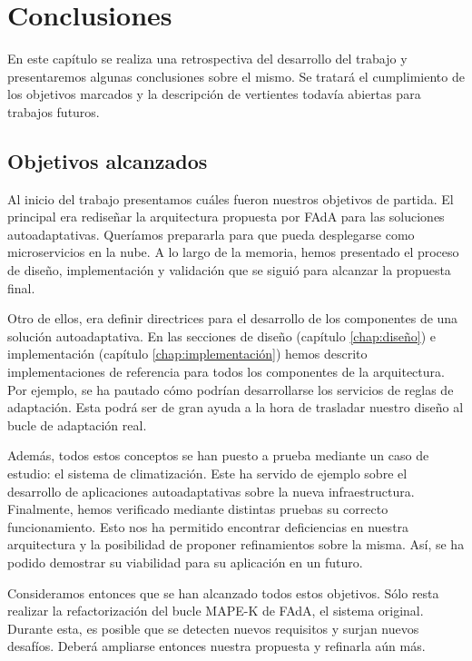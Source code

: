 \chapter{Conclusiones}
\label{chap:conclusiones}

En este capítulo se realiza una retrospectiva del desarrollo del trabajo y presentaremos algunas conclusiones sobre el mismo. Se tratará el cumplimiento de los objetivos marcados y la descripción de vertientes todavía abiertas para trabajos futuros.

\section{Objetivos alcanzados}

Al inicio del trabajo presentamos cuáles fueron nuestros objetivos de partida. El principal era rediseñar la arquitectura propuesta por FAdA para las soluciones autoadaptativas. Queríamos prepararla para que pueda desplegarse como microservicios en la nube. A lo largo de la memoria, hemos presentado el proceso de diseño, implementación y validación que se siguió para alcanzar la propuesta final.

Otro de ellos, era definir directrices para el desarrollo de los componentes de una solución autoadaptativa. En las secciones de diseño (capítulo \ref{chap:diseño}) e implementación (capítulo \ref{chap:implementación}) hemos descrito implementaciones de referencia para todos los componentes de la arquitectura. Por ejemplo, se ha pautado cómo podrían desarrollarse los servicios de reglas de adaptación. Esta podrá ser de gran ayuda a la hora de trasladar nuestro diseño al bucle de adaptación real.

Además, todos estos conceptos se han puesto a prueba mediante un caso de estudio: el sistema de climatización. Este ha servido de ejemplo sobre el desarrollo de aplicaciones autoadaptativas sobre la nueva infraestructura. Finalmente, hemos verificado mediante distintas pruebas su correcto funcionamiento. Esto nos ha permitido encontrar deficiencias en nuestra arquitectura y la posibilidad de proponer refinamientos sobre la misma. Así, se ha podido demostrar su viabilidad para su aplicación en un futuro.

Consideramos entonces que se han alcanzado todos estos objetivos. Sólo resta realizar la refactorización del bucle MAPE-K  de FAdA, el sistema original. Durante esta, es posible que se detecten nuevos requisitos y surjan nuevos desafíos. Deberá ampliarse entonces nuestra propuesta y refinarla aún más.

